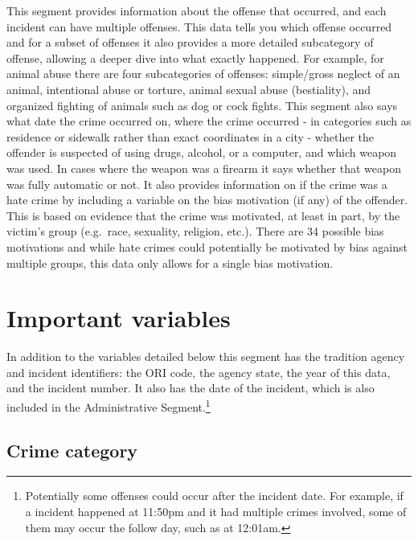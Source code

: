 \documentclass[
  12pt,
  openany]{book}
\begin{document}
This segment provides information about the offense that occurred, and each incident can have multiple offenses. This data tells you which offense occurred and for a subset of offenses it also provides a more detailed subcategory of offense, allowing a deeper dive into what exactly happened. For example, for animal abuse there are four subcategories of offenses: simple/gross neglect of an animal, intentional abuse or torture, animal sexual abuse (bestiality), and organized fighting of animals such as dog or cock fights. This segment also says what date the crime occurred on, where the crime occurred - in categories such as residence or sidewalk rather than exact coordinates in a city - whether the offender is suspected of using drugs, alcohol, or a computer, and which weapon was used. In cases where the weapon was a firearm it says whether that weapon was fully automatic or not. It also provides information on if the crime was a hate crime by including a variable on the bias motivation (if any) of the offender. This is based on evidence that the crime was motivated, at least in part, by the victim's group (e.g.~race, sexuality, religion, etc.). There are 34 possible bias motivations and while hate crimes could potentially be motivated by bias against multiple groups, this data only allows for a single bias motivation.

\hypertarget{important-variables-1}{%
\section{Important variables}\label{important-variables-1}}

In addition to the variables detailed below this segment has the tradition agency and incident identifiers: the ORI code, the agency state, the year of this data, and the incident number. It also has the date of the incident, which is also included in the Administrative Segment.\footnote{Potentially some offenses could occur after the incident date. For example, if a incident happened at 11:50pm and it had multiple crimes involved, some of them may occur the follow day, such as at 12:01am.}

\hypertarget{crime-category}{%
\subsection{Crime category}\label{crime-category}}
\end{document}
